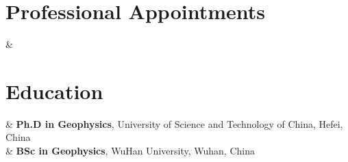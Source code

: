 \section{Professional Appointments}

\begin{EntriesTable}
    &
\end{EntriesTable}

\section{Education}

\begin{EntriesTable}
    &
  \textbf{Ph.D in Geophysics}, University of Science and Technology of China, Hefei, China
  \\
    &
  \textbf{BSc in Geophysics}, WuHan University, Wuhan, China
\end{EntriesTable}
